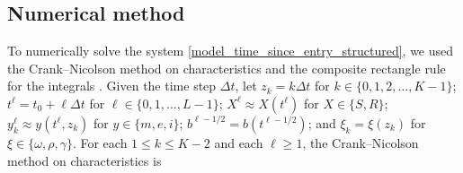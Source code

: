 \documentclass[USenglish]{article}
\begin{document}
\subsection{Numerical method}

To numerically solve the system
\eqref{model_time_since_entry_structured}, we used the Crank--Nicolson
method on characteristics and the composite rectangle rule for the
integrals \autocite{milner_1992}.  Given the time step $\Delta t$,
let $z_k = k \Delta t$
for $k \in \{0, 1, 2, \ldots, K - 1\}$;
$t^{\ell} = t_0 + \ell \Delta t$
for $\ell \in \{0, 1, \ldots, L - 1\}$;
$X^{\ell} \approx X(t^{\ell})$
for $X \in \{S, R\}$;
$y_k^{\ell} \approx y(t^{\ell}, z_k)$
for $y \in \{m, e, i\}$;
$b^{\ell - 1 / 2} = b(t^{\ell - 1 / 2})$;
and $\xi_k = \xi(z_k)$
for $\xi \in \{\omega, \rho, \gamma\}$.
For each $1 \leq k \leq K - 2$
and each $\ell \geq 1$,
the Crank--Nicolson method on characteristics is
\end{document}
